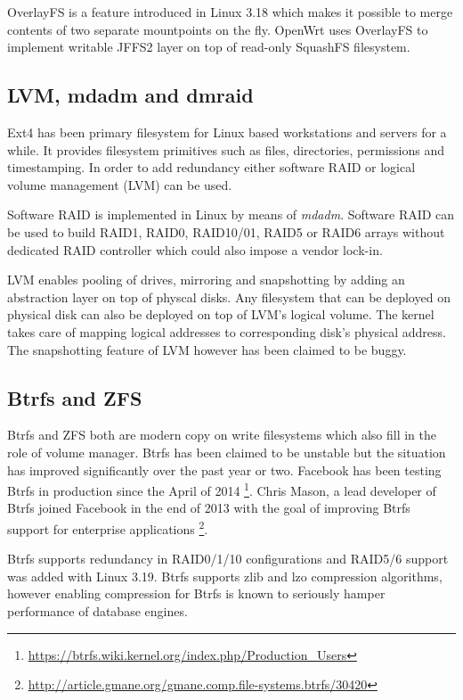 \documentclass[a4paper,11pt]{kth-mag}
\begin{document}
OverlayFS is a feature introduced in Linux 3.18 which makes it
possible to merge contents of two separate mountpoints on the fly. \cite{overlayfs}
OpenWrt uses OverlayFS to implement writable JFFS2 layer on top of
read-only SquashFS filesystem. 

\subsection{LVM, mdadm and dmraid}

Ext4 has been primary filesystem for Linux based workstations and
servers for a while. It provides filesystem primitives such as files,
directories, permissions and timestamping.
In order to add redundancy
either software RAID or logical volume management (LVM) can be used.

Software RAID is implemented in Linux by means of \emph{mdadm}.
Software RAID can be used to build RAID1, RAID0, RAID10/01, RAID5
or RAID6 arrays without dedicated RAID controller which could also
impose a vendor lock-in.

LVM enables pooling of drives, mirroring and snapshotting by adding
an abstraction layer on top of physcal disks. Any filesystem that
can be deployed on physical disk can also be deployed on top of
LVM's logical volume. The kernel takes care of mapping logical
addresses to corresponding disk's physical address.
The snapshotting feature of LVM however has been claimed to be buggy.
\cite{fedora-and-lvm}


\subsection{Btrfs and ZFS}

Btrfs and ZFS both are modern copy on write filesystems
which also fill in the role of volume manager.
Btrfs has been claimed to be unstable but the situation has
improved significantly over the past year or two.
Facebook has been testing Btrfs in production since the April of 2014
\footnote{\url{https://btrfs.wiki.kernel.org/index.php/Production_Users}}.
Chris Mason, a lead developer of Btrfs joined Facebook
in the end of 2013 with the goal of improving Btrfs support
for enterprise applications
\footnote{\url{http://article.gmane.org/gmane.comp.file-systems.btrfs/30420}}.

Btrfs supports redundancy in RAID0/1/10 configurations and
RAID5/6 support was added with Linux 3.19. \cite{btrfs-for-3.19}
Btrfs supports zlib and lzo compression algorithms,
however enabling compression for Btrfs is known to
seriously hamper performance of database engines.
\end{document}

